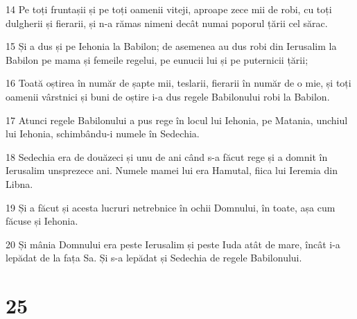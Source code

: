 \par 14 Pe toți fruntașii și pe toți oamenii viteji, aproape zece mii de robi, cu toți dulgherii și fierarii, și n-a rămas nimeni decât numai poporul țării cel sărac.
\par 15 Și a dus și pe Iehonia la Babilon; de asemenea au dus robi din Ierusalim la Babilon pe mama și femeile regelui, pe eunucii lui și pe puternicii țării;
\par 16 Toată oștirea în număr de șapte mii, teslarii, fierarii în număr de o mie, și toți oamenii vârstnici și buni de oștire i-a dus regele Babilonului robi la Babilon.
\par 17 Atunci regele Babilonului a pus rege în locul lui Iehonia, pe Matania, unchiul lui Iehonia, schimbându-i numele în Sedechia.
\par 18 Sedechia era de douăzeci și unu de ani când s-a făcut rege și a domnit în Ierusalim unsprezece ani. Numele mamei lui era Hamutal, fiica lui Ieremia din Libna.
\par 19 Și a făcut și acesta lucruri netrebnice în ochii Domnului, în toate, așa cum făcuse și Iehonia.
\par 20 Și mânia Domnului era peste Ierusalim și peste Iuda atât de mare, încât i-a lepădat de la fața Sa. Și s-a lepădat și Sedechia de regele Babilonului.

\chapter{25}

